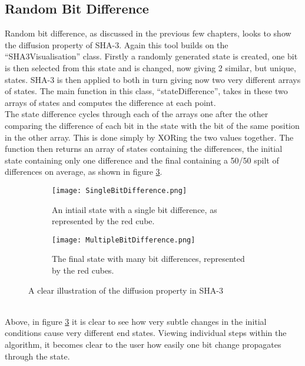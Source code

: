 \subsection{Random Bit Difference}
Random bit difference, as discussed in the previous few chapters, looks to show the diffusion property of SHA-3. Again this tool builds on the ``SHA3Visualisation'' class. Firstly a randomly generated state is created, one bit is then selected from this state and is changed, now giving 2 similar, but unique, states. SHA-3 is then applied to both in turn giving now two very different arrays of states. The main function in this class, ``stateDifference'', takes in these two arrays of states and computes the difference at each point.
\vspace{5mm}\\
The state difference cycles through each of the arrays one after the other comparing the difference of each bit in the state with the bit of the same position in the other array. This is done simply by XORing the two values together. The function then returns an array of states containing the differences, the initial state containing only one difference and the final containing a 50/50 spilt of differences on average, as shown in figure \ref{fig:FlipBitDifference}.
\begin{figure}[h!]
\advance\leftskip-1cm
\begin{subfigure}{.5\textwidth}
\texttt{[image: SingleBitDifference.png]}
    \caption{An intiail state with a single bit difference, as represented by the red cube.}
    \label{fig:initialStateFBD}
\end{subfigure}
\advance\rightskip-1cm
\hfill\begin{subfigure}{.5\textwidth}
\texttt{[image: MultipleBitDifference.png]}
    \caption{The final state with many bit differences, represented by the red cubes.}
    \label{fig:FinalStateFBD}
\end{subfigure}
\caption{A clear illustration of the diffusion property in SHA-3}
\label{fig:FlipBitDifference}
\end{figure}
\vspace{0mm}\\
Above, in figure \ref{fig:FlipBitDifference} it is clear to see how very subtle changes in the initial conditions cause very different end states. Viewing individual steps within the algorithm, it becomes clear to the user how easily one bit change  propagates through the state.

